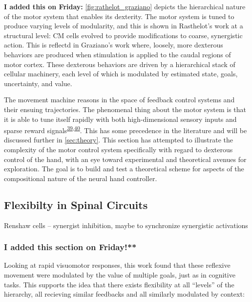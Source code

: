 \documentclass[
  a4paper,
]{article}
\begin{document}
\textbf{I added this on Friday:} \cref{fig:rathelot_graziano} depicts
the hierarchical nature of the motor system that enables its dexterity.
The motor system is tuned to produce varying levels of modularity, and
this is shown in Rasthelot's work at a structural level: CM cells
evolved to provide modifications to coarse, synergistic action. This is
reflectd in Graziano's work where, loosely, more dexterous behaviors are
produced when stimulation is applied to the caudal regions of motor
cortex. These dexterous behaviors are driven by a hierarchical stack of
cellular machinery, each level of which is modulated by estimated state,
goals, uncertainty, and value.

The movement machine reasons in the space of feedback control systems
and their ensuing trajectories. The phenomenal thing about the motor
system is that it is able to tune itself rapidly with both
high-dimensional sensory inputs and sparse reward
signals\textsuperscript{\protect\hyperlink{ref-bahlNeuralDynamicPoliciesfor2020}{39},\protect\hyperlink{ref-ijspeertDynamicalMovementPrimitives2013}{40}}.
This has some precedence in the literature and will be discussed further
in \cref{sec:theory}. This section has attempted to illustrate the
complexity of the motor control system specifically with regard to
dexterous control of the hand, with an eye toward experimental and
theoretical avenues for exploration. The goal is to build and test a
theoretical scheme for aspects of the compositional nature of the neural
hand controller.

\hypertarget{flexibilty-in-spinal-circuits}{%
\subsection{Flexibilty in Spinal
Circuits}\label{flexibilty-in-spinal-circuits}}

Renshaw cells -- synergist inhibition, maybe to synchronize synergistic
activations

\hypertarget{i-added-this-section-on-friday}{%
\subsubsection{I added this section on
Friday!**}\label{i-added-this-section-on-friday}}

Looking at rapid visuomotor responses, this work found that these
reflexive movement were modulated by the value of multiple goals, just
as in cognitive tasks. This supports the idea that there exists
flexibility at all ``levels'' of the hierarchy, all recieving similar
feedbacks and all similarly modulated by context:
\end{document}
